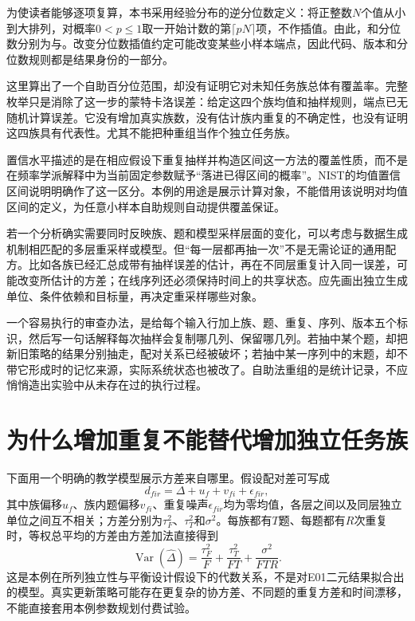 为使读者能够逐项复算，本书采用经验分布的逆分位数定义：将正整数$N$个值从小到大排列，对概率$0<p\le1$取一开始计数的第$\lceil pN\rceil$项，不作插值。由此，和分位数分别为与。改变分位数插值约定可能改变某些小样本端点，因此代码、版本和分位数规则都是结果身份的一部分。

这里算出了一个自助百分位范围，却没有证明它对未知任务族总体有覆盖率。完整枚举只是消除了这一步的蒙特卡洛误差：给定这四个族均值和抽样规则，端点已无随机计算误差。它没有增加真实族数，没有估计族内重复的不确定性，也没有证明这四族具有代表性。尤其不能把种重组当作个独立任务族。

置信水平描述的是在相应假设下重复抽样并构造区间这一方法的覆盖性质，而不是在频率学派解释中为当前固定参数赋予“落进已得区间的概率”。NIST的均值置信区间说明明确作了这一区分\cite{nist-confidence-mean}。本例的用途是展示计算对象，不能借用该说明对均值区间的定义，为任意小样本自助规则自动提供覆盖保证。

若一个分析确实需要同时反映族、题和模型采样层面的变化，可以考虑与数据生成机制相匹配的多层重采样或模型。但“每一层都再抽一次”不是无需论证的通用配方。比如各族已经汇总成带有抽样误差的估计，再在不同层重复计入同一误差，可能改变所估计的方差；在线序列还必须保持时间上的共享状态。应先画出独立生成单位、条件依赖和目标量，再决定重采样哪些对象。

一个容易执行的审查办法，是给每个输入行加上族、题、重复、序列、版本五个标识，然后写一句话解释每次抽样会复制哪几列、保留哪几列。若抽中某个题，却把新旧策略的结果分别抽走，配对关系已经被破坏；若抽中某一序列中的末题，却不带它形成时的记忆来源，实际系统状态也被改了。自助法重组的是统计记录，不应悄悄造出实验中从未存在过的执行过程。

\section{为什么增加重复不能替代增加独立任务族}

下面用一个明确的教学模型展示方差来自哪里。假设配对差可写成
\begin{equation}
 d_{fir}=\Delta+u_f+v_{fi}+\epsilon_{fir},
\end{equation}
其中族偏移$u_f$、族内题偏移$v_{fi}$、重复噪声$\epsilon_{fir}$均为零均值，各层之间以及同层独立单位之间互不相关；方差分别为$\tau_F^2$、$\tau_T^2$和$\sigma^2$。每族都有$T$题、每题都有$R$次重复时，等权总平均的方差由方差加法直接得到
\begin{equation}
 \operatorname{Var}(\widehat\Delta)
 =\frac{\tau_F^2}{F}+\frac{\tau_T^2}{FT}
   +\frac{\sigma^2}{FTR}.
 \label{eq:appa-variance-levels}
\end{equation}
这是本例在所列独立性与平衡设计假设下的代数关系，不是对E01二元结果拟合出的模型。真实更新策略可能存在更复杂的协方差、不同题的重复方差和时间漂移，不能直接套用本例参数规划付费试验。


